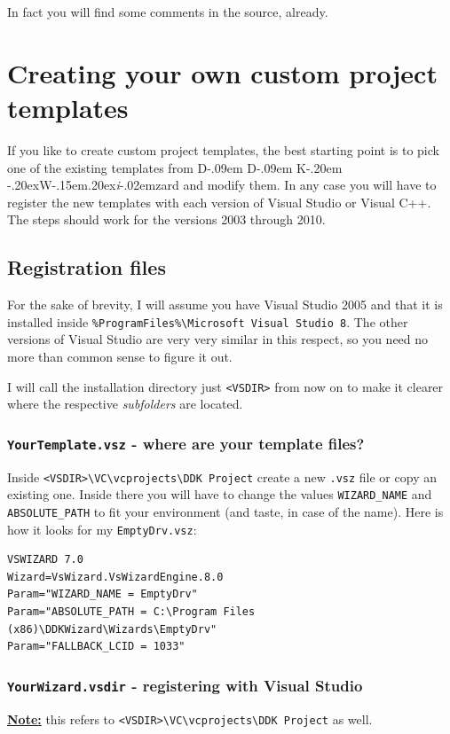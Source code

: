 \documentclass[a4paper,titlepage]{report}
\def\ddkwiz{D\kern-.09em D\kern-.09em K\kern-.20em \raise-.20ex\hbox{W}\kern-.15em\raise.20ex\hbox{\it{i}}\kern-.02em{zard}}
\begin{document}
In fact you will find some comments in the source, already.

\chapter{Creating your own custom project templates}
\label{cha:CreateOwnTemplates}
If you like to create custom project templates, the best starting point is to pick one
of the existing templates from \ddkwiz{} and modify them. In any case you will have to
register the new templates with each version of Visual Studio or Visual C++.
The steps should work for the versions 2003 through 2010.

\section{Registration files}
For the sake of brevity, I will assume you have Visual Studio 2005 and that it is installed
inside \verb+%ProgramFiles%\Microsoft Visual Studio 8+. The other versions of Visual Studio
are very very similar in this respect, so you need no more than common
sense to figure it out.

I will call the installation directory just \verb+<VSDIR>+ from now on to make it clearer
where the respective \emph{subfolders} are located.

\subsection{\texttt{YourTemplate.vsz} - where are your template files?}
Inside \verb+<VSDIR>\VC\vcprojects\DDK Project+ create a new \texttt{.vsz} file or copy
an existing one. Inside there you will have to change the values \verb+WIZARD_NAME+
and \verb+ABSOLUTE_PATH+ to fit your environment (and taste, in case of the name).
Here is how it looks for my \texttt{EmptyDrv.vsz}:\label{sec:templatepath}

\begin{verbatim}
VSWIZARD 7.0
Wizard=VsWizard.VsWizardEngine.8.0
Param="WIZARD_NAME = EmptyDrv"
Param="ABSOLUTE_PATH = C:\Program Files (x86)\DDKWizard\Wizards\EmptyDrv"
Param="FALLBACK_LCID = 1033"
\end{verbatim}

\subsection{\texttt{YourWizard.vsdir} - registering with Visual Studio}
\underline{\textbf{Note:}} this refers to \verb+<VSDIR>\VC\vcprojects\DDK Project+
as well.
\end{document}
